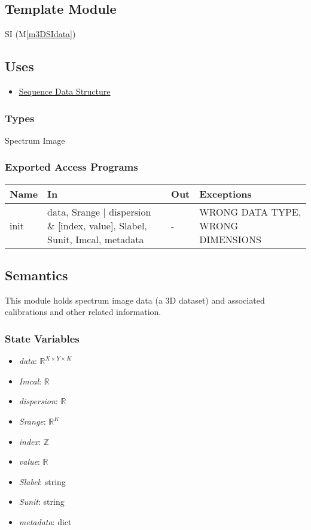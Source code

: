 \documentclass[12pt, titlepage]{article}
\newcommand{\mref}[1]{M\ref{#1}}
\begin{document}
\subsection{Template Module}
SI (\mref{m3DSIdata})

\subsection{Uses}
\begin{itemize}
    \item \hyperref[Mod:Seq]{Sequence Data Structure}
\end{itemize}

\subsubsection{Types}
Spectrum Image

\subsubsection{Exported Access Programs}

\begin{center}
    \begin{tabular}{p{1.5cm} p{4cm} p{4cm} p{4cm}}
        \toprule
        \textbf{Name} & \textbf{In} & \textbf{Out} & \textbf{Exceptions} \\
        \midrule
        init & data, Srange $|$ dispersion $\&$ [index, value], Slabel, Sunit,
        Imcal, metadata & - & WRONG DATA TYPE, WRONG DIMENSIONS \\
        \bottomrule
    \end{tabular}
\end{center}

\subsection{Semantics}
This module holds spectrum image data (a 3D dataset) and associated calibrations
and other related information.

\subsubsection{State Variables}
\begin{itemize}
    \item \textit{data}: $\mathbb{R}^{X \times Y \times K}$
    \item \textit{Imcal}: $\mathbb{R}$
    \item \textit{dispersion}: $\mathbb{R}$
    \item \textit{Srange}: $\mathbb{R}^{K}$
    \item \textit{index}: $\mathbb{Z}$
    \item \textit{value}: $\mathbb{R}$
    \item \textit{Slabel}: string
    \item \textit{Sunit}: string
    \item \textit{metadata}: dict
\end{itemize}
\end{document}
